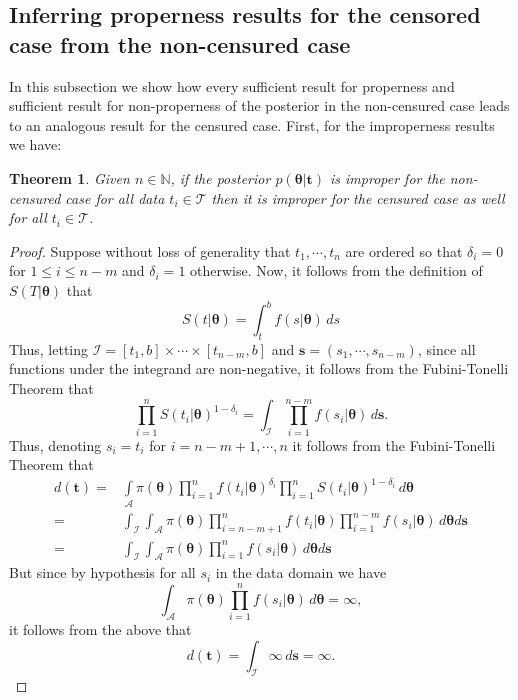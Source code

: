 \documentclass[]{interact}
\newcommand{\N}{\mathbb{N}}
\newcommand{\bs}{\boldsymbol}
\theoremstyle{plain}%
\newtheorem{theorem}{Theorem}[section]
\theoremstyle{definition}
\theoremstyle{remark}
\begin{document}
\subsection{Inferring properness results for the censored case from the non-censured case}

In this subsection we show how every sufficient result for properness and sufficient result for non-properness of the posterior in the non-censured case leads to an analogous result for the censured case. First, for the improperness results we have:

\begin{theorem}\label{theorem-21} Given $n\in \N$, if the posterior $p(\bs{\theta}|\bs{t})$ is improper for the non-censured case for all data $t_i\in \mathcal{T}$ then it is improper for the censured case as well for all $t_i\in \mathcal{T}$.
\end{theorem}
\begin{proof}  Suppose without loss of generality that $t_1,\cdots,t_n$ are ordered so that $\delta_i=0$ for $1\leq i\leq n-m$ and $\delta_i=1$ otherwise. Now, it follows from the definition of $S(T|\bs{\theta})$ that
\begin{equation*}S(t|\bs{\theta}) =\int_{t}^b f(s|\bs{\theta})\,  ds
\end{equation*}
Thus, letting $\mathcal{I}=[t_1,b]\times \cdots \times [t_{n-m},b]$ and $\bs{s} = (s_1,\cdots,s_{n-m})$, since all functions under the integrand are non-negative, it follows from the Fubini-Tonelli Theorem that
\begin{equation*} \prod_{i=1}^n S(t_i|\bs{\theta})^{1-\delta_i} = \int_{\mathcal{I}} \prod_{i=1}^{n-m} f(s_i|\bs{\theta})\,d\bs{s}.
\end{equation*}
Thus, denoting $s_i = t_i$ for $i=n-m+1,\cdots, n$ it follows from the Fubini-Tonelli Theorem that
 \begin{equation*}
 \begin{aligned}
d(\bs{t})=  &\int\limits_{\mathcal{A}}\pi(\bs{\theta})\prod_{i=1}^n f(t_i|\bs{\theta})^{\delta_i}\prod_{i=1}^n S(t_i|\bs{\theta})^{1-\delta_i}\, d\bs{\theta}\\
= &\int_{\mathcal{I}} \int_{\mathcal{A}}\pi(\bs{\theta})\prod_{i=n-m+1}^n f(t_i|\bs{\theta})\prod_{i=1}^{n-m} f(s_i|\bs{\theta})\, d\bs{\theta}d\bs{s}\\
=& \int_{\mathcal{I}}\int_{\mathcal{A}}\pi(\bs{\theta})\prod_{i=1}^n f(s_i|\bs{\theta})\, d\bs{\theta}d\bs{s}
\end{aligned}
\end{equation*}
But since by hypothesis for all $s_i$ in the data domain we have
\begin{equation*}\int_{\mathcal{A}}\pi(\bs{\theta})\prod_{i=1}^n f(s_i|\bs{\theta})\, d\bs{\theta} = \infty,
\end{equation*}
it follows from the above that
\begin{equation*}d(\bs{t}) = \int_{\mathcal{I}} \infty\, d\bs{s} = \infty.
\end{equation*}
\end{proof}
\end{document}
